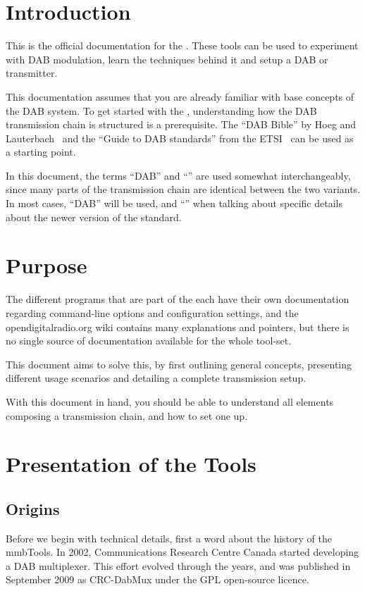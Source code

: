 \section{Introduction}
This is the official documentation for the \mmbtools. These tools can be used to
experiment with DAB modulation, learn the techniques behind it and setup a DAB
or \dabplus transmitter.

This documentation assumes that you are already familiar with base concepts of
the DAB system. To get started with the \mmbtools, understanding how the DAB
transmission chain is structured is a prerequisite. The ``DAB Bible'' by Hoeg
and Lauterbach~\cite{hoeg} and the ``Guide to DAB standards'' from the
ETSI~\cite{etsidabguide} can be used as a starting point.

In this document, the terms ``DAB'' and ``\dabplus'' are used somewhat
interchangeably, since many parts of the transmission chain are identical
between the two variants. In most cases, ``DAB'' will be used, and ``\dabplus''
when talking about specific details about the newer version of the standard.


\section{Purpose}
The different programs that are part of the \mmbtools each have their own
documentation regarding command-line options and configuration settings, and the
opendigitalradio.org wiki
contains many explanations and pointers, but there is
no single source of documentation available for the whole tool-set.

This document aims to solve this, by first outlining general concepts,
presenting different usage scenarios and detailing a complete transmission
setup.

With this document in hand, you should be able to understand all elements
composing a \mmbtools transmission chain, and how to set one up.

\section{Presentation of the Tools}
\subsection{Origins}
Before we begin with technical details, first a word about the history of
the mmbTools.
In 2002, Communications Research Centre Canada
started developing a DAB multiplexer. This effort evolved through the years, and
was published in September 2009 as \mbox{CRC-DabMux} under the GPL
open-source licence.

